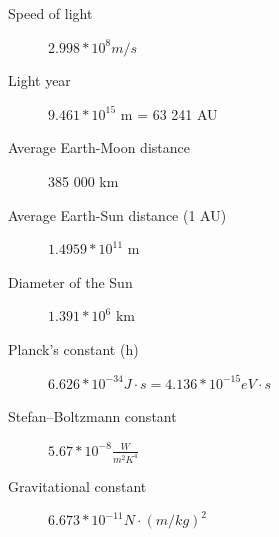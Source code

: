 \documentclass[12pt]{article}
\begin{document}
\begin{description}
    \item[Speed of light] $2.998 * 10^8 m/s$
    \item[Light year] $9.461 * 10^{15}$ m = 63 241 AU
    \item[Average Earth-Moon distance] 385 000 km
    \item[Average Earth-Sun distance (1 AU)] $1.4959 * 10^{11}$ m
    \item[Diameter of the Sun] $1.391 * 10^6$ km
    \item[Planck's constant (h)] $6.626 * 10^{-34} J \cdot s = 4.136 * 10^{-15} eV \cdot s$
    \item[Stefan–Boltzmann constant] $5.67 * 10^{-8} \frac{W}{m^2 K^4}$
    \item[Gravitational constant] $6.673 * 10^{-11} N \cdot (m/kg)^2$
\end{description}
\end{document}
